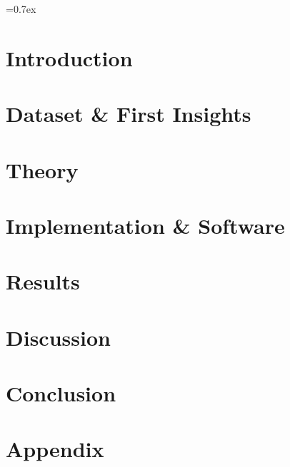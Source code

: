 


	
	\font=0.7ex%

	
	\thispagestyle{empty}
	\tableofcontents
	\thispagestyle{empty}
	
	\pagestyle{fancy}
	\fancyhf{}
	\cfoot{\thepage}
	
	\newpage	
	\section{Introduction}
	
	
	\section{Dataset \& First Insights}\label{sec:dataset}
	
	
	\section{Theory}\label{sec:theory}
	
	
	\section{Implementation \& Software}					\label{sec:implementation_software}
	
	
	\section{Results}\label{sec:results}
	
	
	\section{Discussion}\label{sec:discussion}
	
	
	\section{Conclusion}\label{sec:conclusion}
	

	\newpage
	\printbibliography
	
	\newpage
	\section*{Appendix}\label{sec:appendix}
	
	
